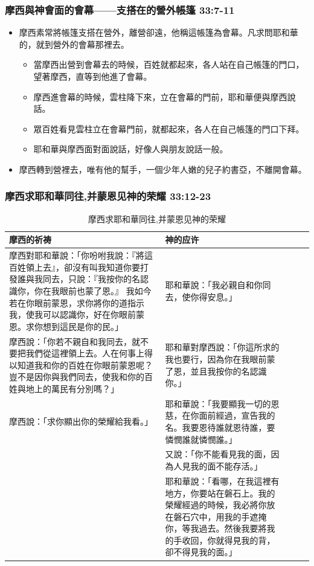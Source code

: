 \begin{table}
\subsubsection{摩西與神會面的會幕——支搭在的營外帳篷 33:7-11}
\begin{itemize}
\itemsep-.35em
\item 摩西素常將帳篷支搭在營外，離營卻遠，他稱這帳篷為會幕。凡求問耶和華的，就到營外的會幕那裡去。 
\begin{itemize}
\itemsep-.35em
\item 當摩西出營到會幕去的時候，百姓就都起來，各人站在自己帳篷的門口，望著摩西，直等到他進了會幕。
 \item 摩西進會幕的時候，雲柱降下來，立在會幕的門前，耶和華便與摩西說話。
\item 眾百姓看見雲柱立在會幕門前，就都起來，各人在自己帳篷的門口下拜。
\item 耶和華與摩西面對面說話，好像人與朋友說話一般。
\end{itemize}
\item 摩西轉到營裡去，唯有他的幫手，一個少年人嫩的兒子約書亞，不離開會幕。
\end{itemize}


\subsubsection{摩西求耶和華同往,并蒙恩见神的荣耀 33:12-23}
\begin{table}[H]
\begin{threeparttable}
\begin{tabular}{@{}p{}*{4}{L{\tabcolsep\relax}}@{}}
\toprule
摩西的祈祷 &  神的应许 \\\hline
摩西對耶和華說：「你吩咐我說：『將這百姓領上去』，卻沒有叫我知道你要打發誰與我同去，只說：『我按你的名認識你，你在我眼前也蒙了恩。』 我如今若在你眼前蒙恩，求你將你的道指示我，使我可以認識你，好在你眼前蒙恩。求你想到這民是你的民。」&耶和華說：「我必親自和你同去，使你得安息。」\tabularnewline\hline
摩西說：「你若不親自和我同去，就不要把我們從這裡領上去。人在何事上得以知道我和你的百姓在你眼前蒙恩呢？豈不是因你與我們同去，使我和你的百姓與地上的萬民有分別嗎？」&耶和華對摩西說：「你這所求的我也要行，因為你在我眼前蒙了恩，並且我按你的名認識你。」 \tabularnewline\hline
摩西說：「求你顯出你的榮耀給我看。」&耶和華說：「我要顯我一切的恩慈，在你面前經過，宣告我的名。我要恩待誰就恩待誰，要憐憫誰就憐憫誰。」 \tabularnewline\hline
&又說：「你不能看見我的面，因為人見我的面不能存活。」 \tabularnewline\hline
&耶和華說：「看哪，在我這裡有地方，你要站在磐石上。我的榮耀經過的時候，我必將你放在磐石穴中，用我的手遮掩你，等我過去。然後我要將我的手收回，你就得見我的背，卻不得見我的面。」 \tabularnewline
\bottomrule
\end{tabular}
\caption{摩西求耶和華同往,并蒙恩见神的荣耀}
\end{threeparttable}
\end{table} 


\end{table}
